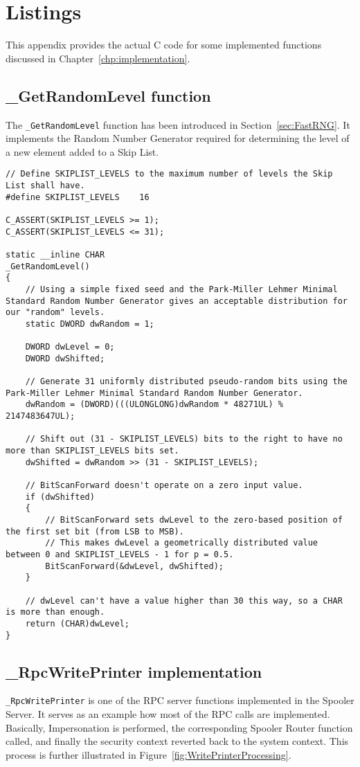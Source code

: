 \chapter{Listings}
This appendix provides the actual C code for some implemented functions discussed in Chapter~\ref{chp:implementation}.


\section{\_GetRandomLevel function}
\label{sec:GetRandomLevel}
The \texttt{\_GetRandomLevel} function has been introduced in Section~\ref{sec:FastRNG}.
It implements the Random Number Generator required for determining the level of a new element added to a Skip List.
\bigskip

\begin{lstlisting}
// Define SKIPLIST_LEVELS to the maximum number of levels the Skip List shall have.
#define SKIPLIST_LEVELS    16

C_ASSERT(SKIPLIST_LEVELS >= 1);
C_ASSERT(SKIPLIST_LEVELS <= 31);

static __inline CHAR
_GetRandomLevel()
{
    // Using a simple fixed seed and the Park-Miller Lehmer Minimal Standard Random Number Generator gives an acceptable distribution for our "random" levels.
    static DWORD dwRandom = 1;

    DWORD dwLevel = 0;
    DWORD dwShifted;

    // Generate 31 uniformly distributed pseudo-random bits using the Park-Miller Lehmer Minimal Standard Random Number Generator.
    dwRandom = (DWORD)(((ULONGLONG)dwRandom * 48271UL) % 2147483647UL);

    // Shift out (31 - SKIPLIST_LEVELS) bits to the right to have no more than SKIPLIST_LEVELS bits set.
    dwShifted = dwRandom >> (31 - SKIPLIST_LEVELS);

    // BitScanForward doesn't operate on a zero input value.
    if (dwShifted)
    {
        // BitScanForward sets dwLevel to the zero-based position of the first set bit (from LSB to MSB).
        // This makes dwLevel a geometrically distributed value between 0 and SKIPLIST_LEVELS - 1 for p = 0.5.
        BitScanForward(&dwLevel, dwShifted);
    }

    // dwLevel can't have a value higher than 30 this way, so a CHAR is more than enough.
    return (CHAR)dwLevel;
}
\end{lstlisting}


\section{\_RpcWritePrinter implementation}
\label{sec:RpcWritePrinter}
\texttt{\_RpcWritePrinter} is one of the \gls{RPC} server functions implemented in the Spooler Server.
It serves as an example how most of the \gls{RPC} calls are implemented.
Basically, Impersonation is performed, the corresponding Spooler Router function called, and finally the security context reverted back to the system context.
This process is further illustrated in Figure~\ref{fig:WritePrinterProcessing}.
\bigskip

